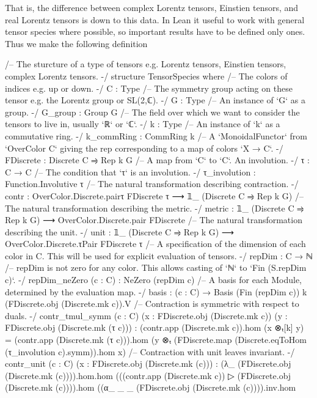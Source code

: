 \documentclass[a4paper, 11pt]{article}
\begin{document}
That is, the difference between complex Lorentz tensors, Einstien tensors, and real Lorentz tensors 
is down to this data. 
In Lean it useful to work with general tensor species where possible, so important results have 
to be defined only ones. Thus we make the following definition 
\begin{codeLong}
/-- The sturcture of a type of tensors e.g. Lorentz tensors, Einstien tensors,
  complex Lorentz tensors. -/
structure TensorSpecies where
  /-- The colors of indices e.g. up or down. -/
  C : Type
  /-- The symmetry group acting on these tensor e.g. the Lorentz group or SL(2,ℂ). -/
  G : Type
  /-- An instance of `G` as a group. -/
  G_group : Group G
  /-- The field over which we want to consider the tensors to live in, usually `ℝ` or `ℂ`. -/
  k : Type
  /-- An instance of `k` as a commutative ring. -/
  k_commRing : CommRing k
  /-- A `MonoidalFunctor` from `OverColor C` giving the rep corresponding to a map of colors
    `X → C`. -/
  FDiscrete : Discrete C ⥤ Rep k G
  /-- A map from `C` to `C`. An involution. -/
  τ : C → C
  /-- The condition that `τ` is an involution. -/
  τ_involution : Function.Involutive τ
  /-- The natural transformation describing contraction. -/
  contr : OverColor.Discrete.pairτ FDiscrete τ ⟶ 𝟙_ (Discrete C ⥤ Rep k G)
  /-- The natural transformation describing the metric. -/
  metric : 𝟙_ (Discrete C ⥤ Rep k G) ⟶ OverColor.Discrete.pair FDiscrete
  /-- The natural transformation describing the unit. -/
  unit : 𝟙_ (Discrete C ⥤ Rep k G) ⟶ OverColor.Discrete.τPair FDiscrete τ
  /-- A specification of the dimension of each color in C. This will be used for explicit
    evaluation of tensors. -/
  repDim : C → ℕ
  /-- repDim is not zero for any color. This allows casting of `ℕ` to `Fin (S.repDim c)`. -/
  repDim_neZero (c : C) : NeZero (repDim c)
  /-- A basis for each Module, determined by the evaluation map. -/
  basis : (c : C) → Basis (Fin (repDim c)) k (FDiscrete.obj (Discrete.mk c)).V
  /-- Contraction is symmetric with respect to duals. -/
  contr_tmul_symm (c : C) (x : FDiscrete.obj (Discrete.mk c))
      (y : FDiscrete.obj (Discrete.mk (τ c))) :
    (contr.app (Discrete.mk c)).hom (x ⊗ₜ[k] y) = (contr.app (Discrete.mk (τ c))).hom
      (y ⊗ₜ (FDiscrete.map (Discrete.eqToHom (τ_involution c).symm)).hom x)
  /-- Contraction with unit leaves invariant. -/
  contr_unit (c : C) (x : FDiscrete.obj (Discrete.mk (c))) :
    (λ_ (FDiscrete.obj (Discrete.mk (c)))).hom.hom
    (((contr.app (Discrete.mk c)) ▷ (FDiscrete.obj (Discrete.mk (c)))).hom
    ((α_ _ _ (FDiscrete.obj (Discrete.mk (c)))).inv.hom

\end{codeLong}
\end{document}
